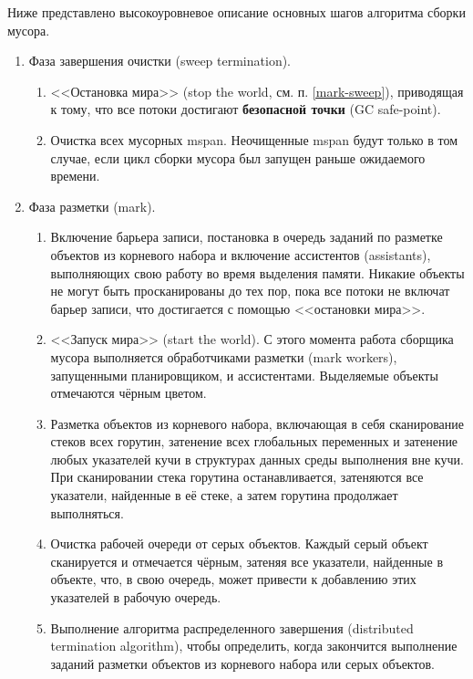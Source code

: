 Ниже представлено высокоуровневое описание основных шагов алгоритма сборки мусора. \cite{golang_gc}

\begin{enumerate}[label*=\arabic*.]
	\item Фаза завершения очистки (sweep termination).
	\begin{enumerate}[label*=\arabic*.]
		\item <<Остановка мира>> (stop the world, см. п. \ref{mark-sweep}), приводящая к тому, что все потоки достигают \textbf{безопасной точки} (GC safe-point).
		\item Очистка всех мусорных mspan. Неочищенные mspan будут только в том случае, если цикл сборки мусора был запущен раньше ожидаемого времени.
	\end{enumerate}

	\item Фаза разметки (mark).
	\begin{enumerate}[label*=\arabic*.]
		\item Включение барьера записи, постановка в очередь заданий по разметке объектов из корневого набора и включение ассистентов (assistants), выполняющих свою работу во время выделения памяти. Никакие объекты не могут быть просканированы до тех пор, пока все потоки не включат барьер записи, что достигается с помощью <<остановки мира>>.
		\item <<Запуск мира>> (start the world). С этого момента работа сборщика мусора выполняется обработчиками разметки (mark workers), запущенными планировщиком, и ассистентами. Выделяемые объекты отмечаются чёрным цветом.
		\item Разметка объектов из корневого набора, включающая в себя сканирование стеков всех горутин, затенение всех глобальных переменных и затенение любых указателей кучи в структурах данных среды выполнения вне кучи. При сканировании стека горутина останавливается, затеняются все указатели, найденные в её стеке, а затем горутина продолжает выполняться.
		\item Очистка рабочей очереди от серых объектов. Каждый серый объект сканируется и отмечается чёрным, затеняя все указатели, найденные в объекте, что, в свою очередь, может привести к добавлению этих указателей в рабочую очередь.
		\item Выполнение алгоритма распределенного завершения (distributed termination algorithm), чтобы определить, когда закончится выполнение заданий разметки объектов из корневого набора или серых объектов.
	\end{enumerate}


\end{enumerate}
